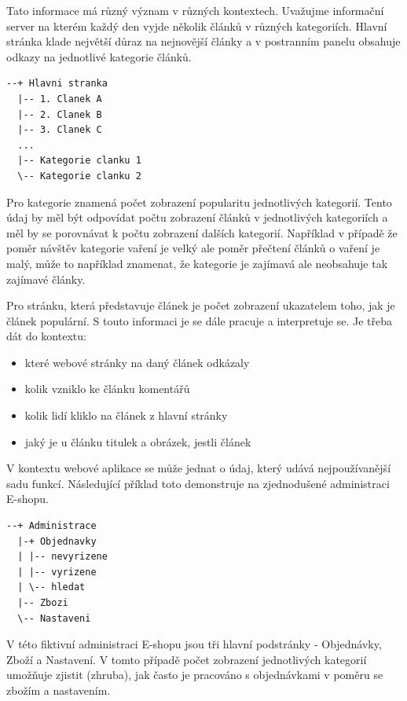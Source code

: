 \documentclass[bc,male,java,dept456]{diploma}						%
\begin{document}
Tato informace má různý význam v různých kontextech. Uvažujme informační server na kterém každý den vyjde několik článků v různých kategoriích. Hlavní stránka klade největší důraz na nejnovější články a v postranním panelu obsahuje odkazy na jednotlivé kategorie článků.

\begin{lstlisting}[label=src:Plain,caption=Struktura informačního serveru]
--+ Hlavni stranka
  |-- 1. Clanek A
  |-- 2. Clanek	B	
  |-- 3. Clanek	C
  ...
  |-- Kategorie clanku 1
  \-- Kategorie clanku 2
\end{lstlisting}

Pro kategorie znamená počet zobrazení popularitu jednotlivých kategorií. Tento údaj by měl být odpovídat počtu zobrazení článků v jednotlivých kategoriích a měl by se porovnávat k počtu zobrazení dalších kategorií. Například v případě že poměr návštěv kategorie vaření je velký ale poměr přečtení článků o vaření je malý, může to například znamenat, že kategorie je zajímavá ale neobsahuje tak zajímavé články.

Pro stránku, která představuje článek je počet zobrazení ukazatelem toho, jak je článek populární. S touto informaci je se dále pracuje a interpretuje se. Je třeba dát do kontextu:
\begin{itemize}
  \item{které webové stránky na daný článek odkázaly}
  \item{kolik vzniklo ke článku komentářů}
  \item{kolik lidí kliklo na článek z hlavní stránky}
  \item{jaký je u článku titulek a obrázek, jestli článek}
\end{itemize}


V kontextu webové aplikace se může jednat o údaj, který udává nejpoužívanější sadu funkcí. Následující příklad toto demonstruje na zjednodušené administraci E-shopu.

\begin{lstlisting}[label=src:Plain,caption=Struktura administrace elektronického obchodu]
--+ Administrace
  |-+ Objednavky
  | |-- nevyrizene
  | |-- vyrizene
  | \-- hledat
  |-- Zbozi
  \-- Nastaveni
\end{lstlisting}

V této fiktivní administraci E-shopu jsou tři hlavní podstránky - Objednávky, Zboží a Nastavení. V tomto případě počet zobrazení jednotlivých kategorií umožňuje zjistit (zhruba), jak často je pracováno s objednávkami v poměru se zbožím a nastavením.
\end{document}
